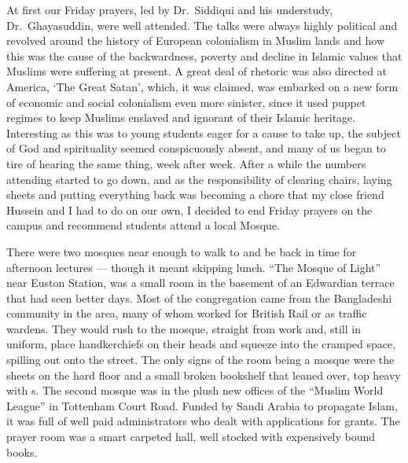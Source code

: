 \documentclass[12pt]{memoir}
\begin{document}
At first our Friday prayers, led by Dr.\ Siddiqui and his understudy,
Dr.\ Ghayasuddin, were well attended.
The talks were always highly political
and revolved around the history of European colonialism in Muslim lands
and how this was the cause of the backwardness,
poverty and decline in Islamic values that Muslims were suffering at present.
A great deal of rhetoric was also directed at America,
‘The Great Satan’, which, it was claimed,
was embarked on a new form of economic
and social colonialism even more sinister,
since it used puppet regimes to keep Muslims enslaved
and ignorant of their Islamic heritage.
Interesting as this was to young students eager for a cause to take up,
the subject of God and spirituality seemed conspicuously absent,
and many of us began to tire of hearing the same thing,
week after week.
After a while the numbers attending started to go down,
and as the responsibility of clearing chairs,
laying sheets and putting everything back was becoming a chore
that my close friend Hussein and I had to do on our own,
I decided to end Friday prayers on the campus
and recommend students attend a local Mosque.

There were two mosques near enough to walk to
and be back in time for afternoon lectures — though it meant skipping lunch.
“The Mosque of Light” near Euston Station,
was a small room in the basement of an Edwardian terrace
that had seen better days.
Most of the congregation came from the Bangladeshi community in the area,
many of whom worked for British Rail or as traffic wardens.
They would rush to the mosque, straight from work and,
still in uniform, place handkerchiefs on their heads
and squeeze into the cramped space, spilling out onto the street.
The only signs of the room being a mosque were the sheets on the hard floor
and a small broken bookshelf that leaned over, top heavy with \Quran{}s.
The second mosque was in the plush new offices
of the “Muslim World League” in Tottenham Court Road.
Funded by Saudi Arabia to propagate Islam,
it was full of well paid administrators
who dealt with applications for grants.
The prayer room was a smart carpeted hall,
well stocked with expensively bound books.
\end{document}
